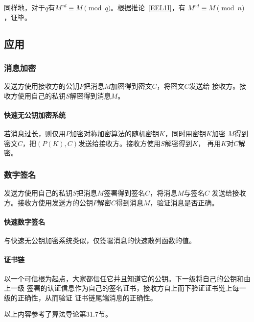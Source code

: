 同样地，对于$q$有$M^{ed}\equiv M \pmod{q}$。根据推论~\ref{EEL1I}，有
$M^{ed}\equiv M \pmod{n}$，证毕。

\subsection{应用}
\subsubsection{消息加密}
发送方使用接收方的公钥$P$把消息$M$加密得到密文$C$，将密文$C$发送给
接收方。接收方使用自己的私钥$S$解密得到消息$M$。
\paragraph{快速无公钥加密系统}
若消息过长，则仅用$P$加密对称加密算法的随机密钥$K$，同时用密钥$K$加密
$M$得到密文$C$，把$(P(K),C)$发送给接收方。接收方使用$S$解密得到$K$，
再用$K$对$C$解密。
\subsubsection{数字签名}
发送方使用自己的私钥$S$把消息$M$签署得到签名$C$，将消息$M$与签名$C$
发送给接收方。接收方使用发送方的公钥$P$解密$C$得到消息$M$，验证消息是否正确。
\paragraph{快速数字签名}
与快速无公钥加密系统类似，仅签署消息的快速散列函数的值。
\paragraph{证书链}
以一个可信根为起点，大家都信任它并且知道它的公钥。下一级将自己的公钥和由上一级
签署的认证信息作为自己的签名证书，接收方自上而下验证证书链上每一级的正确性，从而验证
证书链尾端消息的正确性。

以上内容参考了算法导论\cite{ITA3}第31.7节。
